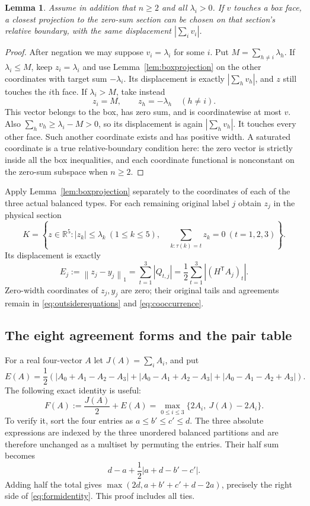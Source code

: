 \documentclass[11pt]{article}
\newtheorem{lemma}[theorem]{Lemma}
\theoremstyle{definition}
\theoremstyle{remark}
\newcommand{\R}{\mathbb R}
\newcommand{\norm}[1]{\left\lVert#1\right\rVert_1}
\newcommand{\abs}[1]{\left|#1\right|}
\begin{document}
\begin{lemma}\label{lem:faceprojection}
Assume in addition that $n\geq2$ and all $\lambda_i>0$. If $v$ touches
a box face, a closest projection to the zero-sum section can be chosen
on that section's relative boundary, with the same displacement
$\abs{\sum_i v_i}$.
\end{lemma}

\begin{proof}
After negation we may suppose $v_i=\lambda_i$ for some $i$. Put
$M=\sum_{h\ne i}\lambda_h$. If $\lambda_i\leq M$, keep
$z_i=\lambda_i$ and use Lemma~\ref{lem:boxprojection} on the other
coordinates with target sum $-\lambda_i$. Its displacement is exactly
$\abs{\sum_h v_h}$, and $z$ still touches the $i$th face.
If $\lambda_i>M$, take instead
\[
 z_i=M,\qquad z_h=-\lambda_h\quad(h\ne i).
\]
This vector belongs to the box, has zero sum, and is coordinatewise at
most $v$. Also $\sum_hv_h\geq\lambda_i-M>0$, so its displacement is
again $\abs{\sum_hv_h}$. It touches every other face. Such another
coordinate exists and has positive width. A saturated coordinate is a
true relative-boundary condition here: the zero vector is strictly
inside all the box inequalities, and each coordinate functional is
nonconstant on the zero-sum subspace when $n\geq2$.
\end{proof}

Apply Lemma~\ref{lem:boxprojection} separately to the coordinates of
each of the three actual balanced types. For each remaining original
label $j$ obtain $z_j$ in the physical section
\begin{equation}\label{eq:section}
 K=\left\{z\in\R^5:
   \abs{z_k}\leq\lambda_k\ (1\leq k\leq5),\quad
   \sum_{k:\tau(k)=t}z_k=0\ (t=1,2,3)\right\}.
\end{equation}
Its displacement is exactly
\begin{equation}\label{eq:payment}
 E_j:=\norm{z_j-y_j}=\sum_{t=1}^3\abs{Q_{t,j}}
   =\frac12\sum_{t=1}^3\abs{(H^{\mathsf T}A_j)_t}.
\end{equation}
Zero-width coordinates of $z_j,y_j$ are zero; their original tails and
agreements remain in \eqref{eq:outsiderequations} and
\eqref{eq:cooccurrence}.

\subsection{The eight agreement forms and the pair table}

For a real four-vector $A$ let $J(A)=\sum_iA_i$, and put
\[
 E(A)=\frac12\left(
 \abs{A_0+A_1-A_2-A_3}
 +\abs{A_0-A_1+A_2-A_3}
 +\abs{A_0-A_1-A_2+A_3}\right).
\]
The following exact identity is useful:
\begin{equation}\label{eq:formidentity}
 F(A):=\frac{J(A)}2+E(A)
   =\max_{0\leq i\leq3}\{2A_i,\ J(A)-2A_i\}.
\end{equation}
To verify it, sort the four entries as $a\leq b'\leq c'\leq d$.
The three absolute expressions are indexed by the three unordered
balanced partitions and are therefore unchanged as a multiset by
permuting the entries. Their half sum becomes
\[
 d-a+\frac12\abs{a+d-b'-c'}.
\]
Adding half the total gives
$\max(2d,a+b'+c'+d-2a)$, precisely the right side of
\eqref{eq:formidentity}. This proof includes all ties.
\end{document}
